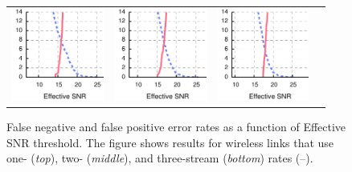 \begin{figure}[p]
\begin{xtrafullpage}
\begin{tabular}{cccc}
	\includegraphics[height=1.2in]{figures/delivery/goodbad/esnr_goodbad_21.pdf} &
	\includegraphics[height=1.2in]{figures/delivery/goodbad/esnr_goodbad_22.pdf} &
	\includegraphics[height=1.2in]{figures/delivery/goodbad/esnr_goodbad_23.pdf}
	\end{tabular}

	\caption[Thresholds and False Negative/Positive Rates with Effective SNR]{\label{fig:esnr_goodbad}False negative and false positive error rates as a function of Effective SNR threshold. The figure shows results for wireless links that use one- (\emph{top}), two- (\emph{middle}), and three-stream (\emph{bottom}) rates (--).}
	\end{xtrafullpage}
\end{figure}

